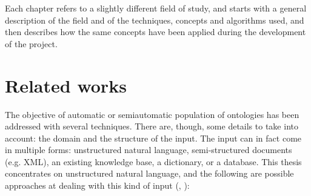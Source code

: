 \documentclass[LaM,oneside,binding=0.6cm]{sapthesis}
\begin{document}
Each chapter refers to a slightly different field of study, and starts with a general description of the field and of the techniques, concepts and algorithms used, and then describes how the same concepts have been applied during the development of the project.

\section{Related works}

The objective of automatic or semiautomatic population of ontologies has been addressed with several techniques. There are, though, some details to take into account: the domain and the structure of the input. The input can in fact come in multiple forms: unstructured natural language, semi-structured documents (e.g. XML), an existing knowledge base, a dictionary, or a database. This thesis concentrates on unstructured natural language, and the following are possible approaches at dealing with this kind of input (\cite{al-aswadi_study_2017}, \cite{biemann_ontology_2005}):
\end{document}
